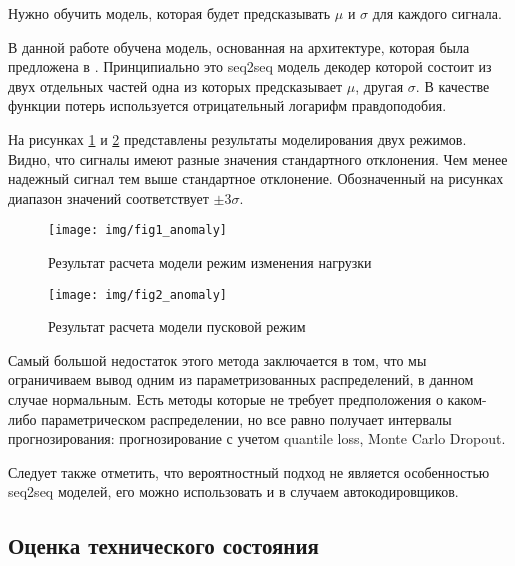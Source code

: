 \documentclass[12pt,a4paper]{article}
\begin{document}
Нужно обучить модель, которая будет предсказывать $\mu$ и $\sigma$ для каждого сигнала.

В данной работе обучена модель, основанная на архитектуре, которая была предложена в \cite{wang_smola}. Принципиально это seq2seq модель декодер которой состоит из двух отдельных частей одна из которых предсказывает $\mu$, другая $\sigma$. В качестве функции потерь используется отрицательный логарифм правдоподобия.
 
На рисунках \ref{fig:fig1_anomaly} и \ref{fig:fig2_anomaly} представлены результаты моделирования двух режимов. Видно, что сигналы имеют разные значения стандартного отклонения.  Чем менее надежный сигнал тем выше стандартное отклонение. Обозначенный на рисунках диапазон значений соответствует $\pm3\sigma$.
 
 \begin{figure}[htbp]
 	\centering\texttt{[image: img/fig1\_anomaly]}
 	\caption{Результат расчета модели режим изменения нагрузки}
 	\label{fig:fig1_anomaly}
 \end{figure}
 
 \begin{figure}[htbp]
 	\centering\texttt{[image: img/fig2\_anomaly]}
 	\caption{Результат расчета модели пусковой режим}
 	\label{fig:fig2_anomaly}
 \end{figure}
 
Самый большой недостаток этого метода заключается в том, что мы ограничиваем вывод одним из параметризованных распределений, в данном случае нормальным. Есть методы которые не требует предположения о каком-либо параметрическом распределении, но все равно получает интервалы прогнозирования: прогнозирование с учетом quantile loss, Monte Carlo Dropout.

Следует также отметить, что вероятностный подход не является особенностью seq2seq моделей, его можно использовать и в случаем автокодировщиков.


\newpage
\subsection{Оценка технического состояния}


%
\end{document}
